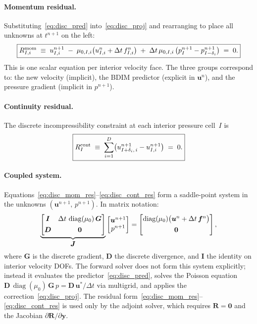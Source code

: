 \documentclass[11pt]{article}
\newcommand{\vect}[1]{\bm{#1}}
\newcommand{\pp}{\partial}
\begin{document}
\paragraph{Momentum residual.}
Substituting~\eqref{eq:disc_pred} into~\eqref{eq:disc_proj} and
rearranging to place all unknowns at $t^{n+1}$ on the left:
\begin{equation}\label{eq:disc_mom_res}
  \boxed{%
  R^{\mathrm{mom}}_{I,i}
  \;\equiv\;
  u^{n+1}_{I,i}
  \;-\;
  \mu_{0,I,i}\bigl(u^{n}_{I,i} + \Delta t\,f^{n}_{I,i}\bigr)
  \;+\;
  \Delta t\,\mu_{0,I,i}\,
    \bigl(p^{n+1}_I - p^{n+1}_{I-\delta_i}\bigr)
  \;=\; 0.}
\end{equation}
This is one scalar equation per interior velocity face.  The three
groups correspond to: the new velocity (implicit), the BDIM predictor
(explicit in $\vect{u}^n$), and the pressure gradient (implicit in
$p^{n+1}$).

\paragraph{Continuity residual.}
The discrete incompressibility constraint at each interior pressure
cell~$I$ is
\begin{equation}\label{eq:disc_cont_res}
  \boxed{%
  R^{\mathrm{cont}}_{I}
  \;\equiv\;
  \sum_{i=1}^{D}\bigl(u^{n+1}_{I+\delta_i,\,i} - u^{n+1}_{I,i}\bigr)
  \;=\; 0.}
\end{equation}

\paragraph{Coupled system.}
Equations~\eqref{eq:disc_mom_res}--\eqref{eq:disc_cont_res} form a
saddle-point system in the unknowns
$(\vect{u}^{n+1},\,p^{n+1})$.  In matrix notation:
\begin{equation}\label{eq:saddle}
  \underbrace{%
    \begin{bmatrix}
      \vect{I} & \Delta t\,\operatorname{diag}(\mu_0)\,\vect{G} \\[4pt]
      \vect{D} & \vect{0}
    \end{bmatrix}
  }_{\displaystyle\vect{J}}
  \begin{bmatrix} \vect{u}^{n+1} \\ p^{n+1} \end{bmatrix}
  =
  \begin{bmatrix}
    \operatorname{diag}(\mu_0)\bigl(\vect{u}^{n}+\Delta t\,\vect{f}^{n}\bigr) \\[4pt]
    \vect{0}
  \end{bmatrix},
\end{equation}
where $\vect{G}$ is the discrete gradient, $\vect{D}$ the discrete
divergence, and $\vect{I}$ the identity on interior velocity DOFs.
The forward solver does not form this system explicitly; instead it
evaluates the predictor~\eqref{eq:disc_pred}, solves the Poisson
equation $\vect{D}\,\operatorname{diag}(\mu_0)\,\vect{G}\,p
= \vect{D}\,\vect{u}^{*}/\Delta t$ via multigrid, and applies the
correction~\eqref{eq:disc_proj}.  The residual
form~\eqref{eq:disc_mom_res}--\eqref{eq:disc_cont_res} is used only
by the adjoint solver, which requires $\vect{R}=\vect{0}$ and the
Jacobian $\pp\vect{R}/\pp\vect{y}$.
\end{document}
